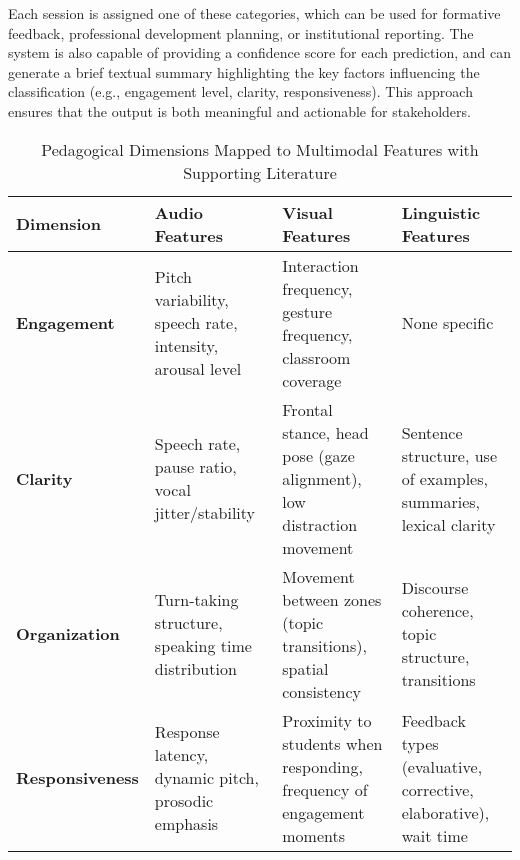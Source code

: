 Each session is assigned one of these categories, which can be used for formative feedback, professional development planning, or institutional reporting. The system is also capable of providing a confidence score for each prediction, and can generate a brief textual summary highlighting the key factors influencing the classification (e.g., engagement level, clarity, responsiveness). This approach ensures that the output is both meaningful and actionable for stakeholders.

\begin{table*}[htbp]
\centering
\renewcommand{\arraystretch}{1.5} %
\setlength{\tabcolsep}{8pt} %
\caption{Pedagogical Dimensions Mapped to Multimodal Features with Supporting Literature}
\begin{tabular}{|p{3cm}|p{4.5cm}|p{4.5cm}|p{3.8cm}|}
\hline
\textbf{\normalsize Dimension} & \textbf{\normalsize Audio Features} & \textbf{\normalsize Visual Features} & \textbf{\normalsize Linguistic Features} \\
\hline

\textbf{Engagement} & 
Pitch variability, speech rate, intensity, arousal level \cite{hou2024encouragement, dmello2012multimodal} & 
Interaction frequency, gesture frequency, classroom coverage \cite{mcneill1992hand, ochoa2016multimodal} & 
None specific \cite{hou2024encouragement, dmello2012multimodal} \\ 
\hline

\textbf{Clarity} & 
Speech rate, pause ratio, vocal jitter/stability \cite{falcon2024discourse, rowe1986wait} & 
Frontal stance, head pose (gaze alignment), low distraction movement \cite{mcneill1992hand, ochoa2016multimodal} & 
Sentence structure, use of examples, summaries, lexical clarity \cite{falcon2024discourse, rowe1986wait} \\
\hline

\textbf{Organization} & 
Turn-taking structure, speaking time distribution \cite{ochoa2016multimodal, dmello2012multimodal} & 
Movement between zones (topic transitions), spatial consistency \cite{mcneill1992hand, ochoa2016multimodal} & 
Discourse coherence, topic structure, transitions \cite{ochoa2016multimodal, dmello2012multimodal} \\
\hline

\textbf{Responsiveness} & 
Response latency, dynamic pitch, prosodic emphasis \cite{rowe1986wait, dmello2012multimodal} & 
Proximity to students when responding, frequency of engagement moments \cite{mcneill1992hand, ochoa2016multimodal} & 
Feedback types (evaluative, corrective, elaborative), wait time \cite{rowe1986wait} \\
\hline


\end{tabular}
\end{table*}
